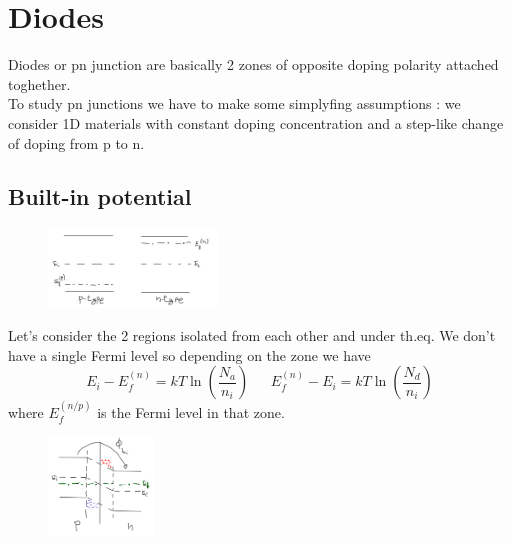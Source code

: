 \chapter{Diodes}
Diodes or pn junction are basically 2 zones of opposite doping polarity attached toghether.\\
To study pn junctions we have to make some simplyfing assumptions : we consider 1D materials with constant doping concentration and a step-like change of doping from p to n.\\
\section{Built-in potential}
\begin{figure}
\includegraphics[width=0.4\textwidth]{pn1.png}
\end{figure}


Let's consider the 2 regions isolated from each other and under th.eq. We don't have a single Fermi level so depending on the zone we have 
\begin{equation}
E_i-E_f^{(n)}=kT\ln(\frac{N_a}{n_i}) \ \ \ \ \ \ \ E_f^{(n)}-E_i=kT\ln(\frac{N_d}{n_i})
\end{equation}
where $E_f^{(n/p)}$ is the Fermi level in that zone.\\

\begin{figure}
\includegraphics[width=0.25\textwidth]{pn2.png}
\end{figure}

